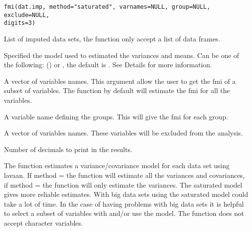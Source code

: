 \documentclass[a4paper]{book}
\begin{document}
%
\begin{Usage}
\begin{verbatim}
fmi(dat.imp, method="saturated", varnames=NULL, group=NULL, exclude=NULL, 
digits=3)
\end{verbatim}
\end{Usage}
%
\begin{Arguments}
\begin{ldescription}
\item[\code{dat.imp}] 
List of imputed data sets, the function only accept a list of data frames.

\item[\code{method}] 
Specified the model used to estimated the variances and means. Can be one of the following:  () or , the default is . See Details for more information.

\item[\code{varnames}] 
A vector of variables names. This argument allow the user to get the fmi of a subset of variables. The function by default will estimate the fmi for all the variables.

\item[\code{group}] 
A variable name defining the groups. This will give the fmi for each group. 

\item[\code{exclude}] 
A vector of variables names. These variables will be excluded from the analysis.

\item[\code{digits}] 
Number of decimals to print in the results.

\end{ldescription}
\end{Arguments}
%
\begin{Details}\relax
The function estimates a variance/covariance model for each data set using lavaan. If method =  the function will estimate all the variances and covariances, 
if method =  the function will only estimate the variances. The saturated model gives more reliable estimates. 
With big data sets using the saturated model could take a lot of time.
In the case of having problems with big data sets it is helpful to select a subset of variables with  and/or use the  model.
The function does not accept character variables.
\end{Details}
%
\end{document}

